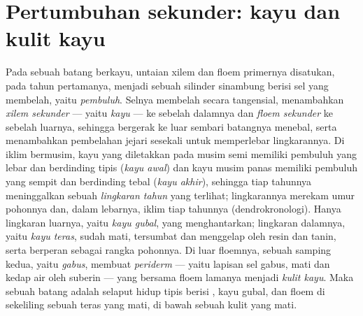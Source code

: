 \section{Pertumbuhan sekunder: kayu dan kulit kayu}

\begin{definition}\label{def:b2:plant-meristems:wood}
%
Pada sebuah batang berkayu, untaian xilem dan floem primernya
disatukan, pada tahun pertamanya, menjadi sebuah silinder sinambung
berisi sel yang membelah, yaitu \emph{ pembuluh}. Selnya
membelah secara tangensial, menambahkan \emph{xilem sekunder} ---
yaitu \emph{kayu} --- ke sebelah dalamnya dan \emph{floem sekunder} ke
sebelah luarnya, sehingga  bergerak ke luar sembari batangnya
menebal, serta menambahkan pembelahan jejari sesekali untuk memperlebar
lingkarannya. Di iklim bermusim, kayu yang diletakkan pada musim semi
memiliki pembuluh yang lebar dan berdinding tipis (\emph{kayu awal})
dan kayu musim panas memiliki pembuluh yang sempit dan berdinding tebal
(\emph{kayu akhir}), sehingga tiap tahunnya meninggalkan sebuah
\emph{lingkaran tahun} yang terlihat; lingkarannya merekam umur
pohonnya dan, dalam lebarnya, iklim tiap tahunnya (dendrokronologi).
Hanya lingkaran luarnya, yaitu \emph{kayu gubal}, yang menghantarkan;
lingkaran dalamnya, yaitu \emph{kayu teras}, sudah mati, tersumbat dan
menggelap oleh resin dan tanin, serta berperan sebagai rangka pohonnya.
Di luar floemnya, sebuah  samping kedua, yaitu \emph{
gabus}, membuat \emph{periderm} --- yaitu lapisan sel gabus, mati dan
kedap air oleh suberin --- yang bersama floem lamanya menjadi
\emph{kulit kayu}. Maka sebuah batang adalah selaput hidup tipis berisi
, kayu gubal, dan floem di sekeliling sebuah teras yang mati, di
bawah sebuah kulit yang mati.
\end{definition}

